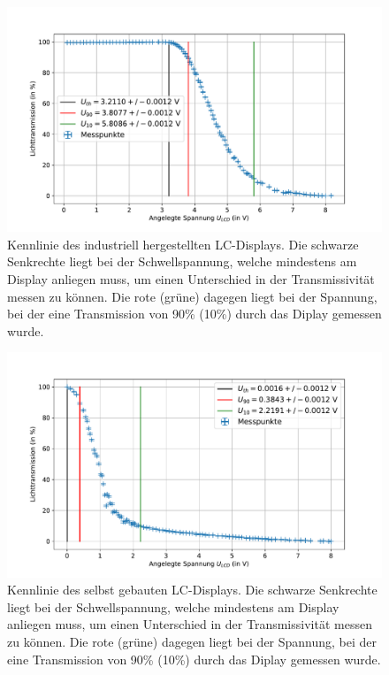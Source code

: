 \documentclass[
	a4paper,
	12pt,
	pagesize,
	ngerman
]{scrartcl}
\begin{document}
	\begin{figure}[H]
			\includegraphics[width=1\linewidth]{images/industry.pdf}
			\caption{Kennlinie des industriell hergestellten LC-Displays.
			Die schwarze Senkrechte liegt bei der Schwellspannung, welche mindestens am Display anliegen muss, um einen Unterschied in der Transmissivität messen zu können.
			Die rote (grüne) dagegen liegt bei der Spannung, bei der eine Transmission von 90\% (10\%) durch das Diplay gemessen wurde.
			}
			\label{fig_industry}
	\end{figure}
	\begin{figure}[H]
			\includegraphics[width=1\linewidth]{images/selfmade.pdf}
			\caption{Kennlinie des selbst gebauten LC-Displays.
			Die schwarze Senkrechte liegt bei der Schwellspannung, welche mindestens am Display anliegen muss, um einen Unterschied in der Transmissivität messen zu können.
			Die rote (grüne) dagegen liegt bei der Spannung, bei der eine Transmission von 90\% (10\%) durch das Diplay gemessen wurde.
			}
			\label{fig_selfmade}
	\end{figure}
\end{document}
